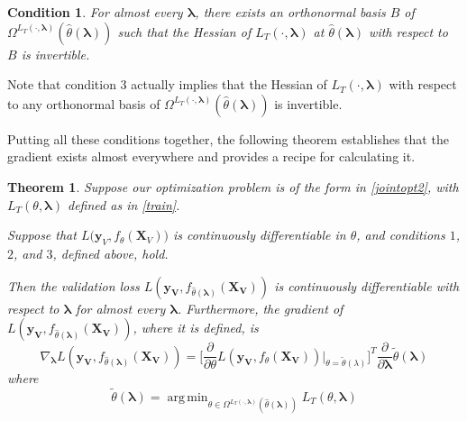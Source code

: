 \documentclass[10pt,letterpaper]{article}
\newtheorem{theorem}{Theorem}
\newtheorem{condition}{Condition}
\DeclareMathOperator*{\argmin}{arg\,min}
\begin{document}
\begin{condition}
For almost every $\boldsymbol{\lambda}$, there exists an orthonormal basis $B$ of $\Omega^{L_T(\cdot, \boldsymbol{\lambda})}(\hat{\theta}\left(\boldsymbol{\lambda}\right))$ such that the Hessian of $L_T\left(\cdot, \boldsymbol{\lambda}\right)$ at $\hat{\theta}\left(\boldsymbol{\lambda}\right)$ with respect to $B$ is invertible.

\end{condition}
Note that condition 3 actually implies that the Hessian of $L_T \left(\cdot, \boldsymbol{\lambda}\right)$ with respect to any orthonormal basis of $\Omega^{L_T(\cdot, \boldsymbol{\lambda})}(\hat{\theta}\left(\boldsymbol{\lambda}\right))$ is invertible.

Putting all these conditions together, the following theorem establishes that the gradient exists almost everywhere and provides a recipe for calculating it.

\begin{theorem}
Suppose our optimization problem is of the form in \eqref{jointopt2}, with $L_T\left(\theta, \boldsymbol{\lambda}\right)$ defined as in \eqref{train}.

Suppose that $L \Big( \boldsymbol{y}_V, f_{\theta}(\boldsymbol{X}_V)\Big)$ is continuously differentiable in $\theta$, and conditions $1$, $2$, and $3$, defined above, hold.

Then the validation loss $L(\boldsymbol{y_V}, f_{\hat \theta(\boldsymbol{\lambda})}(\boldsymbol{X_V}))$ is continuously differentiable with respect to $\boldsymbol{\lambda}$ for almost every $\boldsymbol{\lambda}$. Furthermore, the gradient of $L(\boldsymbol{y_V}, f_{\hat \theta(\boldsymbol{\lambda})}(\boldsymbol{X_V}))$, where it is defined, is
\begin{equation}
\nabla_{\boldsymbol{\lambda}} L(\boldsymbol{y_V}, f_{\hat \theta(\boldsymbol{\lambda})}(\boldsymbol{X_V})) = \Big [ \frac{\partial}{\partial \theta} L(\boldsymbol{y_V}, f_{\theta}(\boldsymbol{X_V})) |_{\theta=\tilde\theta(\lambda)} \Big ]^T \frac{\partial}{\partial \boldsymbol{\lambda}} \tilde{\theta}(\boldsymbol{\lambda})
\end{equation}
where
\begin{equation}
\tilde{\theta}(\boldsymbol{\lambda}) = \argmin_{\theta \in \Omega^{L_T(\cdot, \boldsymbol{\lambda})}(\hat \theta(\boldsymbol{\lambda}))} L_T(\theta , \boldsymbol{\lambda})
\label{restrictedmodelparams}
\end{equation}
\label{thethrm}
\end{theorem}
\end{document}
